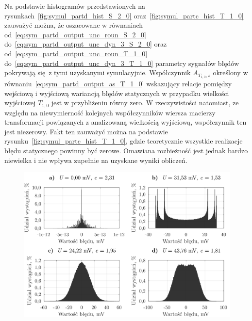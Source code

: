 Na podstawie histogramów przedstawionych na rysunkach~\ref{fig:symul_partd_hist_S_2_0} oraz~\ref{fig:symul_partc_hist_T_1_0} zauważyć można, że oszacowane w równaniach od~\eqref{eq:sym_partd_output_unc_roun_S_2_0} do~\eqref{eq:sym_partd_output_unc_dyn_3_S_2_0} oraz od~\eqref{eq:sym_partd_output_unc_roun_T_1_0} do~\eqref{eq:sym_partd_output_unc_dyn_3_T_1_0} parametry sygnałów błędów pokrywają się z tymi uzyskanymi symulacyjnie. Współczynnik $A_{T_{1,0},s} $ określony w równaniu~\eqref{eq:sym_partd_output_as_T_1_0} wskazujący relacje pomiędzy wejściową i wyjściową wariancją błędów statycznych w przypadku wielkości wyjściowej $T_{1,0}$ jest w przybliżeniu równy zero. W rzeczywistości natomiast, ze względu na niewymierność kolejnych współczynników wiersza macierzy transformacji powiązanych z analizowaną wielkością wyjściową, współczynnik ten jest niezerowy. Fakt ten zauważyć można na podstawie rysunku~\ref{fig:symul_partc_hist_T_1_0}, gdzie teoretycznie wszystkie realizacje błędu statycznego powinny być zerowe. Omawiana rozbieżność jest jednak bardzo niewielka i nie wpływa zupełnie na uzyskane wyniki obliczeń.

\begin{figure}[htb!]
\includegraphics{obrazki/hist_part_T}
\end{figure}

